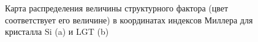   \begin{figure}[h]
    \centering
    \hfill
    \caption{Карта распределения величины структурного фактора
    (цвет соответствует его величине) в координатах индексов Миллера для кристалла Si (a) и LGT (b)}
    \label{ris:hkl_LGT_SI}
  \end{figure}

